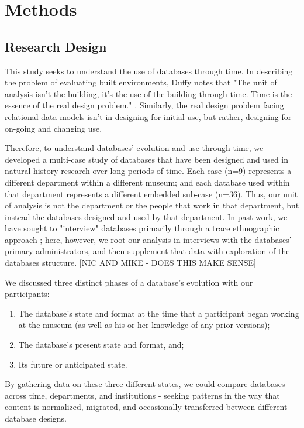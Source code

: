 \section{Methods}

\subsection{Research Design}

This study seeks to understand the use of databases through time. In describing the problem of evaluating built environments, Duffy notes that "The unit of analysis isn't the building, it's the use of the building through time. Time is the essence of the real design problem." \cite{duffy1990measuring}. Similarly, the real design problem facing relational data models isn't in designing for initial use, but rather, designing for on-going and changing use. 

Therefore, to understand databases' evolution and use through time, we developed a multi-case study of databases that have been designed and used in natural history research over long periods of time. Each case (n=9) represents a different department within a different museum; and each database used within that department represents a different embedded sub-case (n=36). Thus, our unit of analysis is not the department or the people that work in that department, but instead the databases designed and used by that department. In past work, we have sought to "interview" databases primarily through a trace ethnographic approach \cite{Geiger_2011}; here, however, we root our analysis in interviews with the databases' primary administrators, and then supplement that data with exploration of the databases structure. [NIC AND MIKE - DOES THIS MAKE SENSE]

We discussed three distinct phases of a database's evolution with our participants: 
\begin{enumerate}
\item The database's state and format at the time that a participant began working at the museum (as well as his or her knowledge of any prior versions); 
\item The database's present state and format, and; 
\item Its future or anticipated state. 
\end{enumerate}
By gathering data on these three different states, we could  compare databases across time, departments, and institutions - seeking patterns in the way that content is normalized, migrated, and occasionally transferred between different database designs. 

